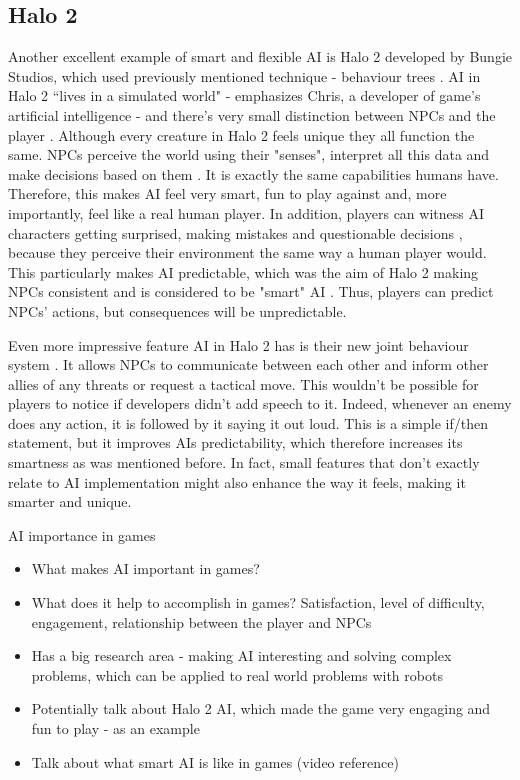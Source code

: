 \documentclass[journal]{IEEEtran}
\begin{document}
\subsection{Halo 2}
Another excellent example of smart and flexible AI is Halo 2 developed by Bungie Studios, which used previously mentioned technique - behaviour trees \cite{behaviourtreeofhalo2}. AI in Halo 2 ``lives in a simulated world" \cite{halo2} - emphasizes Chris, a developer of game's artificial intelligence - and there's very small distinction between NPCs and the player \cite{halo2}. Although every creature in Halo 2 feels unique they all function the same. NPCs perceive the world using their "senses", interpret all this data and make decisions based on them \cite{halo2}. It is exactly the same capabilities humans have. Therefore, this makes AI feel very smart, fun to play against and, more importantly, feel like a real human player. In addition, players can witness AI characters getting surprised, making mistakes and questionable decisions \cite{halo2}, because they perceive their environment the same way a human player would. This particularly makes AI predictable, which was the aim of Halo 2 making NPCs consistent \cite{halo2} and is considered to be "smart" AI \cite{gamemakertoolkit}. Thus, players can predict NPCs' actions, but consequences will be unpredictable.

Even more impressive feature AI in Halo 2 has is their new joint behaviour system \cite{halo2}. It allows NPCs to communicate between each other and inform other allies of any threats or request a tactical move. This wouldn't be possible for players to notice if developers didn't add speech to it. Indeed, whenever an enemy does any action, it is followed by it saying it out loud. This is a simple if/then statement, but it improves AIs predictability, which therefore increases its smartness as was mentioned before. In fact, small features that don't exactly relate to AI implementation might also enhance the way it feels, making it smarter and unique.

AI importance in games
\begin{itemize}
	\item What makes AI important in games?
	\item What does it help to accomplish in games? Satisfaction, level of difficulty, engagement, relationship between the player and NPCs
	\item Has a big research area - making AI interesting and solving complex problems, which can be applied to real world problems with robots
	\item Potentially talk about Halo 2 AI, which made the game very engaging and fun to play - as an example
	\item Talk about what smart AI is like in games (video reference)
\end{itemize}
\end{document}
